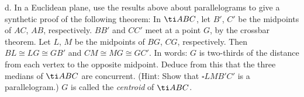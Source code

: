 \documentclass[12pt,letterpaper]{article}
\begin{document}
\noindent d.  In a Euclidean plane, use the results above about parallelograms to give a synthetic proof of the following theorem: In $\ti ABC$, let $B'$, $C'$ be the midpoints of $AC$, $AB$, respectively. $BB'$ and $CC'$ meet at a point $G$, by the crossbar theorem. Let $L$, $M$ be the midpoints of $BG$, $CG$, respectively. Then $BL \cong LG \cong GB'$ and $CM \cong MG \cong GC'$. In words: $G$ is two-thirds of the distance from each vertex to the opposite midpoint. Deduce from this that the three medians of $\ti ABC$ are concurrent. (Hint: Show that $\square LMB'C'$ is a parallelogram.) $G$ is called the \emph{centroid} of $\ti ABC$. \\
\end{document}
